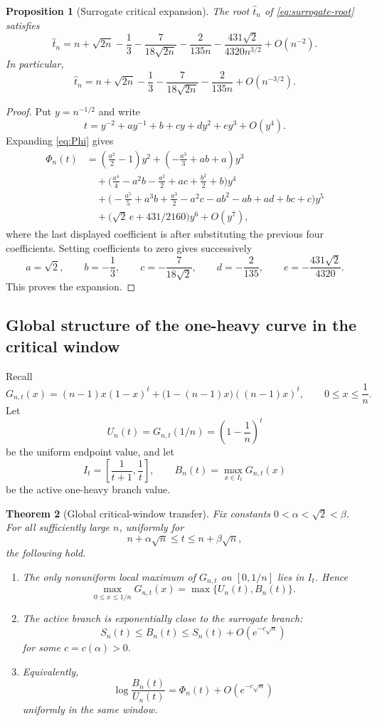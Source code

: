 \documentclass[11pt]{article}
\newtheorem{theorem}{Theorem}[section]
\newtheorem{proposition}[theorem]{Proposition}
\theoremstyle{definition}
\begin{document}
\begin{proposition}[Surrogate critical expansion]\label{prop:surrogate-expansion}
The root $\widehat t_n$ of \eqref{eq:surrogate-root} satisfies
\[
  \widehat t_n
  =n+\sqrt{2n}-\frac13-\frac{7}{18\sqrt{2n}}-\frac{2}{135n}
  -\frac{431\sqrt2}{4320n^{3/2}}+O(n^{-2}).
\]
In particular,
\[
  \widehat t_n
  =n+\sqrt{2n}-\frac13-\frac{7}{18\sqrt{2n}}-\frac{2}{135n}+O(n^{-3/2}).
\]
\end{proposition}

\begin{proof}
Put $y=n^{-1/2}$ and write
\[
  t=y^{-2}+ay^{-1}+b+cy+dy^2+ey^3+O(y^4).
\]
Expanding \eqref{eq:Phi} gives
\begin{align*}
\Phi_n(t)
&=\left(\frac{a^2}{2}-1\right)y^2
 +\left(-\frac{a^3}{3}+ab+a\right)y^3 \\
&\quad+\biggl(\frac{a^4}{4}-a^2b-\frac{a^2}{2}+ac+\frac{b^2}{2}+b\biggr)y^4 \\
&\quad+\biggl(-\frac{a^5}{5}+a^3b+\frac{a^3}{2}-a^2c-ab^2-ab+ad+bc+c\biggr)y^5 \\
&\quad+\bigl(\sqrt2\,e+431/2160\bigr)y^6+O(y^7),
\end{align*}
where the last displayed coefficient is after substituting the previous four coefficients. Setting coefficients to zero gives successively
\[
  a=\sqrt2,
  \qquad b=-\frac13,
  \qquad c=-\frac{7}{18\sqrt2},
  \qquad d=-\frac2{135},
  \qquad e=-\frac{431\sqrt2}{4320}.
\]
This proves the expansion.
\end{proof}

\subsection{Global structure of the one-heavy curve in the critical window}

Recall
\[
  G_{n,t}(x)=(n-1)x(1-x)^t+\bigl(1-(n-1)x\bigr)((n-1)x)^t,
  \qquad 0\le x\le \frac1n.
\]
Let
\[
  U_n(t)=G_{n,t}(1/n)=\left(1-\frac1n\right)^t
\]
be the uniform endpoint value, and let
\[
  I_t=\left[\frac1{t+1},\frac1t\right],
  \qquad
  B_n(t)=\max_{x\in I_t}G_{n,t}(x)
\]
be the active one-heavy branch value.

\begin{theorem}[Global critical-window transfer]\label{thm:global-transfer}
Fix constants $0<\alpha<\sqrt2<\beta$. For all sufficiently large $n$, uniformly for
\[
  n+\alpha\sqrt n\le t\le n+\beta\sqrt n,
\]
the following hold.

\begin{enumerate}[label=\textup{(\roman*)}]
\item The only nonuniform local maximum of $G_{n,t}$ on $[0,1/n]$ lies in $I_t$. Hence
\[
  \max_{0\le x\le 1/n}G_{n,t}(x)=\max\{U_n(t),B_n(t)\}.
\]

\item The active branch is exponentially close to the surrogate branch:
\[
  S_n(t)\le B_n(t)\le S_n(t)+O(e^{-c\sqrt n})
\]
for some $c=c(\alpha)>0$.

\item Equivalently,
\[
  \log\frac{B_n(t)}{U_n(t)}=\Phi_n(t)+O(e^{-c\sqrt n})
\]
uniformly in the same window.
\end{enumerate}
\end{theorem}
\end{document}
